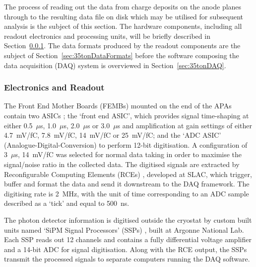 The process of reading out the data from charge deposits on the anode planes through to the resulting data file on disk which may be utilised for subsequent analysis is the subject of this section.  The hardware components, including all readout electronics and processing units, will be briefly described in Section~\ref{sec:35tonElectronicsReadout}.  The data formats produced by the readout components are the subject of Section~\ref{sec:35tonDataFormats} before the software composing the data acquisition (DAQ) system is overviewed in Section~\ref{sec:35tonDAQ}.

\subsubsection{Electronics and Readout}\label{sec:35tonElectronicsReadout}

The Front End Mother Boards (FEMBs) mounted on the end of the APAs contain two ASICs \cite{DeGeronimo2011,Thorn2012}; the `front end ASIC', which provides signal time-shaping at either 0.5~$\mu$s, 1.0~$\mu$s, 2.0~$\mu$s or 3.0~$\mu$s and amplification at gain settings of either 4.7~mV/fC, 7.8~mV/fC, 14~mV/fC or 25~mV/fC; and the `ADC ASIC' (Analogue-Digital-Conversion) to perform 12-bit digitisation.  A configuration of 3~$\mu$s, 14~mV/fC was selected for normal data taking in order to maximise the signal/noise ratio in the collected data.  The digitised signals are extracted by Reconfigurable Computing Elements (RCEs) \cite{Herbst2014}, developed at SLAC, which trigger, buffer and format the data and send it downstream to the DAQ framework.  The digitising rate is 2~MHz, with the unit of time corresponding to an ADC sample described as a `tick' and equal to 500~ns.


The photon detector information is digitised outside the cryostat by custom built units named `SiPM Signal Processors' (SSPs) \cite{SSPManual2016}, built at Argonne National Lab.  Each SSP reads out 12 channels and contains a fully differential voltage amplifier and a 14-bit ADC for signal digitisation.  Along with the RCE output, the SSPs transmit the processed signals to separate computers running the DAQ software.

